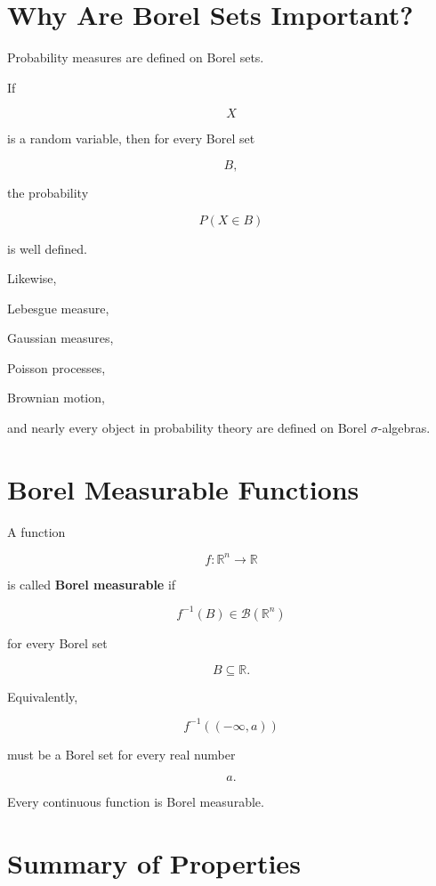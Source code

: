 \documentclass[11pt]{article}
\begin{document}
	
	\section{Why Are Borel Sets Important?}
	
	Probability measures are defined on Borel sets.
	
	If
	
	\[
	X
	\]
	
	is a random variable, then for every Borel set
	
	\[
	B,
	\]
	
	the probability
	
	\[
	P(X\in B)
	\]
	
	is well defined.
	
	Likewise,
	
	Lebesgue measure,
	
	Gaussian measures,
	
	Poisson processes,
	
	Brownian motion,
	
	and nearly every object in probability theory are defined on Borel
	$\sigma$-algebras.
	
	
	\section{Borel Measurable Functions}
	
	A function
	
	\[
	f:\mathbb R^n\to\mathbb R
	\]
	
	is called \textbf{Borel measurable} if
	
	\[
	\boxed{
		f^{-1}(B)
		\in
		\mathcal B(\mathbb R^n)
	}
	\]
	
	for every Borel set
	
	\[
	B
	\subseteq
	\mathbb R.
	\]
	
	Equivalently,
	
	\[
	f^{-1}((-\infty,a))
	\]
	
	must be a Borel set for every real number
	
	\[
	a.
	\]
	
	Every continuous function is Borel measurable.
	
	
	\section{Summary of Properties}
	
\end{document}
